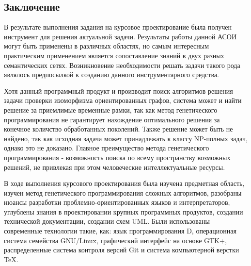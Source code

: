 \documentclass[russian,utf8,emptystyle]{eskdtext}
\begin{document}
\begin{spacing}{1.5}
\newpage
\section{Заключение}
В результате выполнения задания на курсовое проектирование была получен инструмент для решения актуальной задачи. Результаты работы данной АСОИ могут быть применены в различных областях, но самым интересным практическим применением является сопоставление знаний в двух разных семантических сетях. Возникновение необходимости решать задачи такого рода являлось предпосылкой к созданию данного инструментарного средства.

Хотя данный программный продукт и производит поиск алгоритмов решения задачи проверки изоморфизма ориентированных графов, система может и найти решение за приемлимые временные рамки, так как метод генетического программирования не гарантирует нахождение оптимального решения за конечное количство обработанных поколений. Также решение может быть не найдено, так как исходная задача может принадлежать к классу NP-полных задач, однако это не доказано. Главное преимущество метода генетического программирования - возможность поиска по всему пространству возможных решений, не привлекая при этом человеческие интеллектуальные ресурсы.

В ходе выполнения курсового проектирования была изучена предметная область, изучен метод генетического программирования сложных алгоритмов, разобраны нюансы разработки проблемно-ориентированных языков и интерпретаторов, углублены знания в проектировании крупных программных продуктов, создании технической документации, создании схем UML. Были использованы современные технологии такие, как: язык программирования D, операционная система семейства GNU/Linux, графический интерфейс на основе GTK+, распределенные система контроля версий Git и система компьютерной верстки \TeX.

\newpage

\end{spacing}

\newpage
{}









\end{document}
